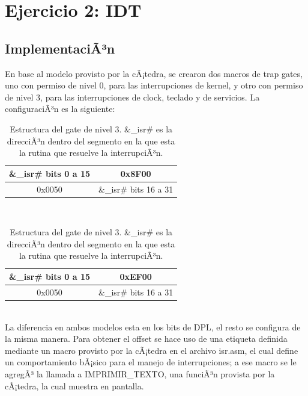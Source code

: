\documentclass[10pt, a4paper]{article}
\begin{document}
\section{Ejercicio 2: IDT}
\subsection{ImplementaciÃ³n}
En base al modelo provisto por la cÃ¡tedra, se crearon dos macros de trap gates, uno con permiso de nivel 0, para las interrupciones de kernel, y otro con permiso de nivel 3, para las interrupciones de clock, teclado y de servicios. La configuraciÃ³n es la siguiente:
\begin{table}[h]
	\begin{subtable}[h]{0.5\textwidth}
		\begin{minipage}{0.9\textwidth}
			\resizebox{8cm}{!} {
				\begin{tabular}{|c|c|}
					\hline
					\&\_isr\# bits 0 a 15 & 0x8F00 \\ \hline
					0x0050 & \&\_isr\# bits 16 a 31 \\
					\hline
				\end{tabular}
			}
			\caption{Estructura del gate de nivel 0. \&\_isr\# es la direcciÃ³n dentro del segmento en la que esta la rutina que resuelve la interrupciÃ³n.}
		\end{minipage}
	\end{subtable}
~
	\begin{subtable}[h]{0.5\textwidth}
		\begin{minipage}{0.9\textwidth}
			\resizebox{8cm}{!} {
				\begin{tabular}{|c|c|}
					\hline
					\&\_isr\# bits 0 a 15 & 0xEF00 \\ \hline
					0x0050 & \&\_isr\# bits 16 a 31 \\
					\hline
				\end{tabular}
			}
			\caption{Estructura del gate de nivel 3. \&\_isr\# es la direcciÃ³n dentro del segmento en la que esta la rutina que resuelve la interrupciÃ³n.}
		\end{minipage}
	\end{subtable}
\end{table}
\\
La diferencia en ambos modelos esta en los bits de DPL, el resto se configura de la misma manera.
Para obtener el offset se hace uso de una etiqueta definida mediante un macro provisto por la cÃ¡tedra en el archivo isr.asm, el cual define un comportamiento bÃ¡sico para el manejo de interrupciones; a ese macro se le agregÃ³ la llamada a IMPRIMIR\_TEXTO, una funciÃ³n provista por la cÃ¡tedra, la cual muestra en pantalla.
\end{document}
